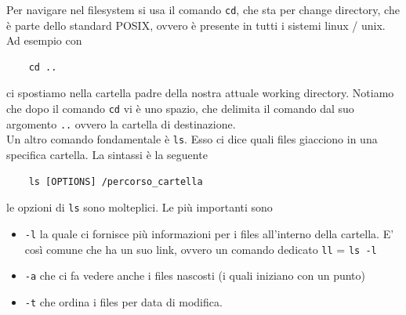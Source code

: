 \documentclass[11pt]{book}
\begin{document}
Per navigare nel filesystem si usa il comando \verb"cd", che sta per change directory, che è parte dello standard POSIX, ovvero è presente in tutti i sistemi linux / unix. Ad esempio con 
\begin{verbatim}
	cd ..
\end{verbatim}
ci spostiamo nella cartella padre della nostra attuale working directory. Notiamo che dopo il comando \verb"cd" vi è uno spazio, che delimita il comando dal suo argomento \verb".." ovvero la cartella di destinazione.\\
Un altro comando fondamentale è \verb"ls". Esso ci dice quali files giacciono in una specifica cartella. La sintassi è la seguente
\begin{verbatim}
	ls [OPTIONS] /percorso_cartella
\end{verbatim}
le opzioni di \verb"ls" sono molteplici. Le più importanti sono
\begin{itemize}
	\item \verb"-l" la quale ci fornisce più informazioni per i files all'interno della cartella. E' così comune che ha un suo link, ovvero un comando dedicato \verb"ll" = \verb"ls -l"
	\item \verb"-a" che ci fa vedere anche i files nascosti (i quali iniziano con un punto)
	\item \verb"-t" che ordina i files per data di modifica.
\end{itemize}
\end{document}
